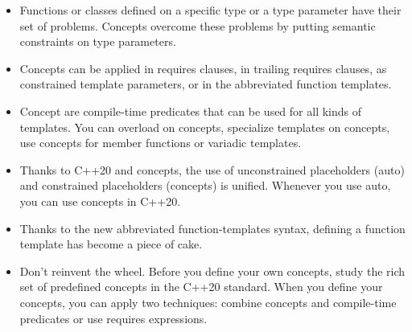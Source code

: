 \begin{tcolorbox}[colback=mygreen!5!white,colframe=mygreen!75!black,title=Distilled Information]
\begin{itemize}
\item 
Functions or classes defined on a specific type or a type parameter have their set of problems. Concepts overcome these problems by putting semantic constraints on type parameters.

\item 
Concepts can be applied in requires clauses, in trailing requires clauses, as constrained template parameters, or in the abbreviated function templates.

\item 
Concept are compile-time predicates that can be used for all kinds of templates. You can overload on concepts, specialize templates on concepts, use concepts for member functions or variadic templates.

\item 
Thanks to C++20 and concepts, the use of unconstrained placeholders (auto) and constrained placeholders (concepts) is unified. Whenever you use auto, you can use concepts in C++20.

\item 
Thanks to the new abbreviated function-templates syntax, defining a function template has become a piece of cake.

\item 
Don’t reinvent the wheel. Before you define your own concepts, study the rich set of predefined concepts in the C++20 standard. When you define your concepts, you can apply two techniques: combine concepts and compile-time predicates or use requires expressions.
\end{itemize}
\end{tcolorbox}



















